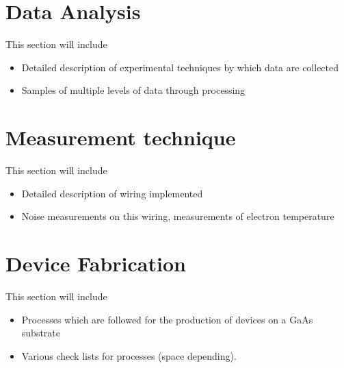 \chapter{Data Analysis}
This section will include 
\begin{itemize}
\item Detailed description of experimental techniques by which data are collected
\item Samples of multiple levels of data through processing
\end{itemize}

\chapter{Measurement technique}
This section will include 
\begin{itemize}
\item Detailed description of wiring implemented
\item Noise measurements on this wiring, measurements of electron temperature
\end{itemize}

\chapter{Device Fabrication}
This section will include 
\begin{itemize}
\item Processes which are followed for the production of devices on a GaAs substrate
\item Various check lists for processes (space depending).
\end{itemize}
